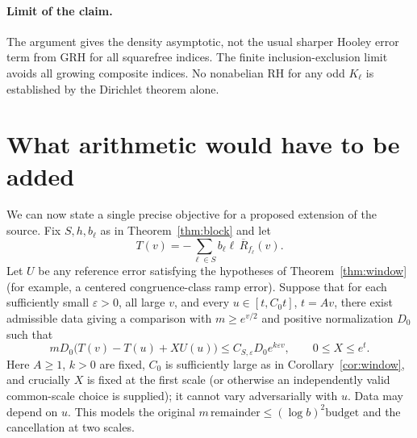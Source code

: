 \documentclass[11pt,letterpaper]{article}
\theoremstyle{definition}\newtheorem{definition}[theorem]{Definition}
\theoremstyle{remark}\newtheorem{remark}[theorem]{Remark}
\begin{document}
\paragraph{Limit of the claim.} The argument gives the density asymptotic, not the usual sharper Hooley error term from GRH for all squarefree indices. The finite inclusion-exclusion limit avoids all growing composite indices. No nonabelian RH for any odd $K_\ell$ is established by the Dirichlet theorem alone.

\section{What arithmetic would have to be added}\label{sec:bridge}
We can now state a single precise objective for a proposed extension of the source. Fix $S,h,b_\ell$ as in Theorem~\ref{thm:block} and let
\[
T(v)=-\sum_{\ell\in S}b_\ell\ell\,\overline R_{f_\ell}(v).
\]
Let $U$ be any reference error satisfying the hypotheses of Theorem~\ref{thm:window} (for example, a centered congruence-class ramp error). Suppose that for each sufficiently small $\varepsilon>0$, all large $v$, and every $u\in[t,C_0t]$, $t=A v$, there exist admissible data giving a comparison with $m\ge e^{v/2}$ and positive normalization $D_0$ such that
\begin{equation}\label{eq:newstar}
 m D_0 \bigl(T(v)-T(u)+X U(u)\bigr)\le C_{S,\varepsilon} D_0 e^{k\varepsilon v},\qquad 0\le X\le e^t.
\end{equation}
Here $A\ge1$, $k>0$ are fixed, $C_0$ is sufficiently large as in Corollary~\ref{cor:window}, and crucially $X$ is fixed at the first scale (or otherwise an independently valid common-scale choice is supplied); it cannot vary adversarially with $u$. Data may depend on $u$. This models the original $m\,\mathrm{remainder}\le(\log b)^2\mathrm{budget}$ and the cancellation at two scales.
\end{document}

